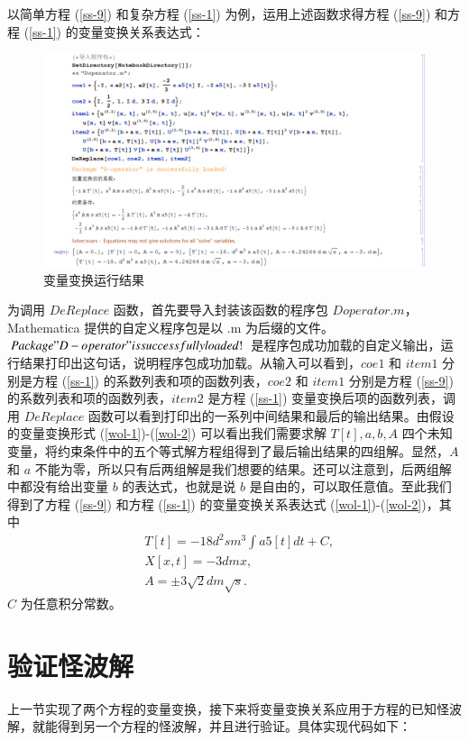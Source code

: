 以简单方程 (\ref{ss-9}) 和复杂方程 (\ref{ss-1}) 为例，运用上述函数求得方程 (\ref{ss-9}) 和方程 (\ref{ss-1}) 的变量变换关系表达式：
\begin{figure}[!htp]
\centering
\includegraphics[width=\linewidth]{replaceResult.jpg}
\caption{变量变换运行结果}
\label{pro-doper3}
\end{figure}
为调用 $DeReplace$ 函数，首先要导入封装该函数的程序包 $Doperator.m$，Mathematica 提供的自定义程序包是以 .m 为后缀的文件。$Package "D-operator" is successfully loaded!$ 是程序包成功加载的自定义输出，运行结果打印出这句话，说明程序包成功加载。从输入可以看到，$coe1$ 和 $item1$ 分别是方程 (\ref{ss-1}) 的系数列表和项的函数列表，$coe2$ 和 $item1$ 分别是方程 (\ref{ss-9}) 的系数列表和项的函数列表，$item2$ 是方程 (\ref{ss-1}) 变量变换后项的函数列表，调用 $DeReplace$ 函数可以看到打印出的一系列中间结果和最后的输出结果。由假设的变量变换形式 (\ref{wol-1})-(\ref{wol-2}) 可以看出我们需要求解 $T[t], a, b, A$ 四个未知变量，将约束条件中的五个等式解方程组得到了最后输出结果的四组解。显然，$A$ 和 $a$ 不能为零，所以只有后两组解是我们想要的结果。还可以注意到，后两组解中都没有给出变量 $b$ 的表达式，也就是说 $b$ 是自由的，可以取任意值。至此我们得到了方程 (\ref{ss-9}) 和方程 (\ref{ss-1}) 的变量变换关系表达式 (\ref{wol-1})-(\ref{wol-2})，其中
\begin{align}
 &T[t]=-18 d^2 s m^3 \int a5[t] dt + C,\nonumber\\
 &X[x,t]=-3 d m x,\nonumber\\
 &A = \pm 3 \sqrt{2} d m \sqrt{s}.\nonumber
\end{align}
$C$ 为任意积分常数。

\section{验证怪波解}
上一节实现了两个方程的变量变换，接下来将变量变换关系应用于方程的已知怪波解，就能得到另一个方程的怪波解，并且进行验证。具体实现代码如下：

